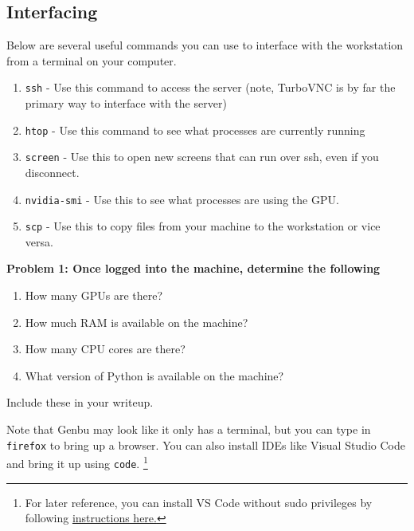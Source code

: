 \subsection*{Interfacing}
Below are several useful commands you can use to interface with the workstation from a terminal on your computer.
\begin{enumerate}
    \item \texttt{ssh} - Use this command to access the server (note, TurboVNC is by far the primary way to interface with the server)
	\item \texttt{htop} - Use this command to see what processes are currently running
	\item \texttt{screen} - Use this to open new screens that can run over ssh, even if you disconnect.
	\item \texttt{nvidia-smi} - Use this to see what processes are using the GPU.
    \item \texttt{scp} - Use this to copy files from your machine to the workstation or vice versa.
\end{enumerate}

{\bf Problem 1: Once logged into the machine, determine the following
\begin{enumerate}[label=(\alph*)]
    \item How many GPUs are there?
    \item How much RAM is available on the machine?
    \item How many CPU cores are there?
    \item What version of Python is available on the machine?
\end{enumerate}
Include these in your writeup.}

Note that Genbu may look like it only has a terminal, but you can type in \texttt{firefox} to bring up a browser. You can also install IDEs like Visual Studio Code and bring it up using \texttt{code}. \footnote{For later reference, you can install VS Code without sudo privileges by following  \href{https://huhuidong.wordpress.com/2018/12/13/how-to-install-visual-studio-code-in-linux-without-root-or-sudo/}{instructions here.} }